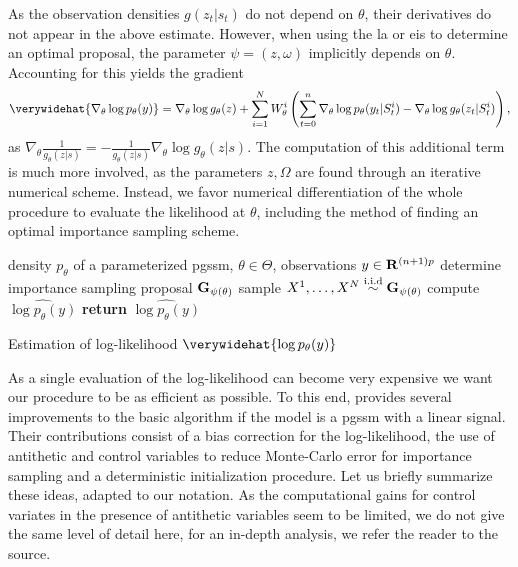 As the observation densities $g(z_{t}|s_{t})$ do not depend on $\theta$, their derivatives do not appear in the above estimate. However, when using the \acrshort{la} or \acrshort{eis} to determine an optimal proposal, the parameter $\psi = (z, \omega)$ implicitly depends on $\theta$. Accounting for this yields the gradient 
$$
    \verywidehat{\nabla_{\theta} \log p_{\theta}(y)} = \nabla_{\theta} \log g_{\theta}(z) + \sum_{i=1}^N W^{i}_\theta \left(\sum_{t = 0}^n \nabla_{\theta} \log p_{\theta}(y_{t}|S_{t}^{i}) - \nabla_{\theta} \log g_{\theta}(z_{t}|S^{i}_{t})\right),
$$
as $\nabla_{\theta} \frac{1}{g_{\theta}(z|s)} = - \frac{1}{g_{\theta}(z|s)} \nabla_{\theta} \log g_{\theta}(z|s)$. The computation of this additional term is much more involved, as the parameters $z,\Omega$ are found through an iterative numerical scheme. Instead, we favor numerical differentiation of the whole procedure to evaluate the likelihood at $\theta$, including the method of finding an optimal importance sampling scheme. 

\begin{algorithm}
    \begin{algorithmic}[1]
        \Require density $p_{\theta}$ of a parameterized \acrshort{pgssm}, $\theta \in \Theta$, observations $y \in \mathbf R^{(n+1)p}$
        \State determine importance sampling proposal $\mathbf G_{\psi(\theta)}$ 
        \State sample $X^{1}, \dots, X^{N} \stackrel{\text{i.i.d}}{\sim} \mathbf G_{\psi(\theta)}$
        \State compute $\widehat{\log p_{\theta}(y)}$ 
        \State \textbf{return} $\widehat{\log p_{\theta}(y)}$
    \end{algorithmic}
    \caption{Estimation of log-likelihood $\verywidehat{\log p_{\theta}(y)}$}
\end{algorithm}

As a single evaluation of the log-likelihood can become very expensive we want our procedure to be as efficient as possible. To this end, \citep{Durbin1997Monte} provides several improvements to the basic algorithm if the model is a \acrshort{pgssm} with a linear signal. Their contributions consist of a bias correction for the log-likelihood, the use of antithetic and control variables to reduce Monte-Carlo error for importance sampling and a deterministic initialization procedure.
Let us briefly summarize these ideas, adapted to our notation. As the computational gains for control variates in the presence of antithetic variables seem to be limited, we do not give the same level of detail here, for an in-depth analysis, we refer the reader to the source. 

